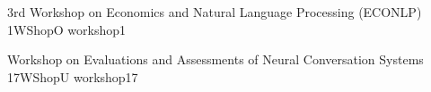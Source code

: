 

\begin{wsschedule}
  {3rd Workshop on Economics and Natural Language Processing (ECONLP)}
  {1}{WShopO}
  {workshop1}
  {\WShopLocI}
  
\end{wsschedule}






\begin{wsschedule}
  {Workshop on Evaluations and Assessments of Neural Conversation Systems}
  {17}{WShopU}
  {workshop17}
  {\WShopLocN}
  
\end{wsschedule}




\clearpage{\thispagestyle{emptyheader}\cleardoublepage}
